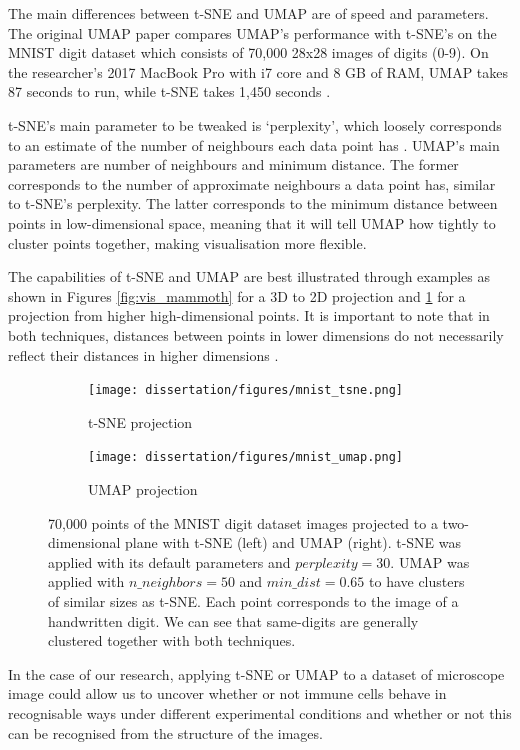 The main differences between t-SNE and UMAP are of speed and parameters. The original UMAP paper compares UMAP's performance with t-SNE's on the MNIST digit dataset which consists of 70,000 28x28 images of digits (0-9). On the researcher's 2017 MacBook Pro with i7 core and 8 GB of RAM, UMAP takes 87 seconds to run, while t-SNE takes 1,450 seconds \citep{umap_arxiv}.

t-SNE's main parameter to be tweaked is `perplexity', which loosely corresponds to an estimate of the number of neighbours each data point has \citep{wattenberg2016how}. UMAP's main parameters are number of neighbours and minimum distance. The former corresponds to the number of approximate neighbours a data point has, similar to t-SNE's perplexity. The latter corresponds to the minimum distance between points in low-dimensional space, meaning that it will tell UMAP how tightly to cluster points together, making visualisation more flexible.

The capabilities of t-SNE and UMAP are best illustrated through examples as shown in Figures \ref{fig:vis_mammoth} for a 3D to 2D projection and \ref{fig:vis_mnist} for a projection from higher high-dimensional points. It is important to note that in both techniques, distances between points in lower dimensions do not necessarily reflect their distances in higher dimensions \citep{Coenon2019}.

\begin{figure}[!ht]
    \centering
    \begin{subfigure}{.45\textwidth}
        \texttt{[image: dissertation/figures/mnist\_tsne.png]}
        \caption{t-SNE projection}
    \end{subfigure}
    \begin{subfigure}{.45\textwidth}
        \texttt{[image: dissertation/figures/mnist\_umap.png]}
        \caption{UMAP projection}
    \end{subfigure}
    \caption{70,000 points of the MNIST digit dataset images projected to a two-dimensional plane with t-SNE (left) and UMAP (right). t-SNE was applied with its default parameters and $perplexity=30$. UMAP was applied with $n\_neighbors=50$ and $min\_dist=0.65$ to have clusters of similar sizes as t-SNE. Each point corresponds to the image of a handwritten digit. We can see that same-digits are generally clustered together with both techniques.}
    \label{fig:vis_mnist}
\end{figure}

In the case of our research, applying t-SNE or UMAP to a dataset of microscope image could allow us to uncover whether or not immune cells behave in recognisable ways under different experimental conditions and whether or not this can be recognised from the structure of the images.


